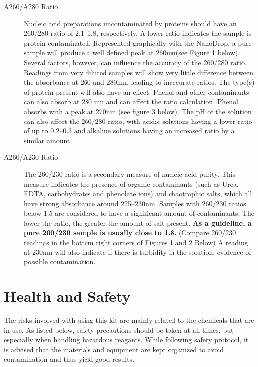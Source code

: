 \documentclass[12pt]{../SOP3_beta}\usepackage[]{graphicx}\usepackage[]{xcolor}
\begin{document}
\begin{description}
  \item[A260/A280 Ratio] Nucleic acid preparations uncontaminated by proteins should have an 260/280 ratio of 2.1--1.8, respectively. A lower ratio indicates the sample is protein contaminated. Represented graphically with the NanoDrop, a pure sample will produce a well defined peak at 260nm(see Figure 1 below). Several factors, however, can influence the accuracy of the 260/280 ratio. Readings from very diluted samples will show very little difference between the absorbance at 260 and 280nm, leading to inaccurate ratios.  The type(s) of protein present will also have an effect. Phenol and other contaminants can also absorb at 280 nm and can affect the ratio calculation. Phenol absorbs with a peak at 270nm (see figure 3 below). The pH of the solution can also affect the 260/280 ratio, with acidic solutions having a lower ratio of up to 0.2--0.3 and alkaline solutions having an increased ratio by a similar amount.
  
  \item[A260/A230 Ratio] The 260/230 ratio is a secondary measure of nucleic acid purity. This measure indicates the presence of organic contaminants (such as Urea, EDTA, carbohydrates and phenolate ions) and chaotrophic salts, which all have strong absorbance around 225--230nm. Samples with 260/230 ratios below 1.5 are considered to have a significant amount of contaminants. The lower the ratio, the greater the amount of salt present. \textbf{As a guideline, a pure 260/230 sample is usually close to 1.8.} (Compare 260/230 readings in the bottom right corners of Figures 1 and 2 Below)  A reading at 230nm will also indicate if there is turbidity in the solution, evidence of possible contamination.  
  



\end{description}

\section{Health and Safety}

\NP The risks involved with using this kit are mainly related to the chemicals that are in use. As listed below, safety precautions should be taken at all times, but especially when handling hazardous reagants. While following safety protocol, it is advised that the materials and equipment are kept organized to avoid contamination and thus yield good results. 
\end{document}
